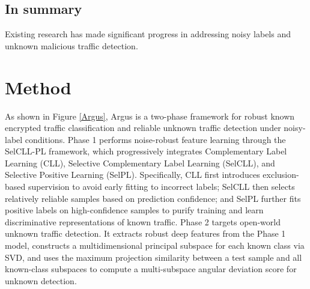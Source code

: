 \documentclass{SCIS2026}
\begin{document}
\cite{FEC-OSL}

\cite{liu2023good}

\cite{luoxiang}

\subsection{In summary}
Existing research has made significant progress in addressing noisy labels and unknown malicious traffic detection. 



\section{Method}\label{Method}
As shown in Figure \ref{Argus}, Argus is a two-phase framework for robust known encrypted traffic classification and reliable unknown traffic detection under noisy-label conditions. Phase 1 performs noise-robust feature learning through the SelCLL-PL framework, which progressively integrates Complementary Label Learning (CLL), Selective Complementary Label Learning (SelCLL), and Selective Positive Learning (SelPL). Specifically, CLL first introduces exclusion-based supervision to avoid early fitting to incorrect labels; SelCLL then selects relatively reliable samples based on prediction confidence; and SelPL further fits positive labels on high-confidence samples to purify training and learn discriminative representations of known traffic. Phase 2 targets open-world unknown traffic detection. It extracts robust deep features from the Phase 1 model, constructs a multidimensional principal subspace for each known class via SVD, and uses the maximum projection similarity between a test sample and all known-class subspaces to compute a multi-subspace angular deviation score for unknown detection.

\end{document}
